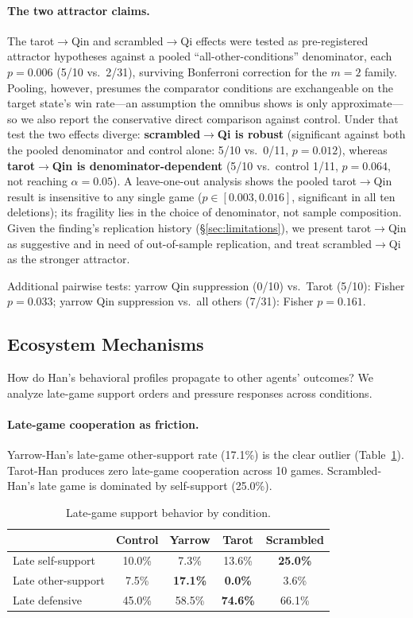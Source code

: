 \documentclass[11pt]{article}
\begin{document}
\paragraph{The two attractor claims.} The tarot$\to$Qin and scrambled$\to$Qi effects were tested as pre-registered attractor hypotheses against a pooled ``all-other-conditions'' denominator, each $p = 0.006$ (5/10 vs.\ 2/31), surviving Bonferroni correction for the $m = 2$ family. Pooling, however, presumes the comparator conditions are exchangeable on the target state's win rate---an assumption the omnibus shows is only approximate---so we also report the conservative direct comparison against control. Under that test the two effects diverge: \textbf{scrambled$\to$Qi is robust} (significant against both the pooled denominator and control alone: 5/10 vs.\ 0/11, $p = 0.012$), whereas \textbf{tarot$\to$Qin is denominator-dependent} (5/10 vs.\ control 1/11, $p = 0.064$, not reaching $\alpha = 0.05$). A leave-one-out analysis shows the pooled tarot$\to$Qin result is insensitive to any single game ($p \in [0.003, 0.016]$, significant in all ten deletions); its fragility lies in the choice of denominator, not sample composition. Given the finding's replication history (\S\ref{sec:limitations}), we present tarot$\to$Qin as suggestive and in need of out-of-sample replication, and treat scrambled$\to$Qi as the stronger attractor.

Additional pairwise tests: yarrow Qin suppression (0/10) vs.\ Tarot (5/10): Fisher $p = 0.033$; yarrow Qin suppression vs.\ all others (7/31): Fisher $p = 0.161$.

\subsection{Ecosystem Mechanisms}
\label{sec:mechanisms}

How do Han's behavioral profiles propagate to other agents' outcomes? We analyze late-game support orders and pressure responses across conditions.

\paragraph{Late-game cooperation as friction.} Yarrow-Han's late-game other-support rate (17.1\%) is the clear outlier (Table~\ref{tab:latesupport}). Tarot-Han produces zero late-game cooperation across 10 games. Scrambled-Han's late game is dominated by self-support (25.0\%).

\begin{table}[t]
\centering
\caption{Late-game support behavior by condition.}
\label{tab:latesupport}
\begin{tabular}{lcccc}
\toprule
& Control & Yarrow & Tarot & Scrambled \\
\midrule
Late self-support & 10.0\% & 7.3\% & 13.6\% & \textbf{25.0\%} \\
Late other-support & 7.5\% & \textbf{17.1\%} & \textbf{0.0\%} & 3.6\% \\
Late defensive & 45.0\% & 58.5\% & \textbf{74.6\%} & 66.1\% \\
\bottomrule
\end{tabular}
\end{table}
\end{document}
